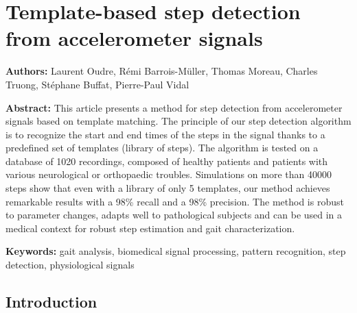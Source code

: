 \documentclass[../thesis.tex]{subfiles}
\begin{document}
\def\crossref{}


\chapter{Template-based step detection from accelerometer signals}
\label{chap:walk:step_detect}



\startcontents[chap7]


\textbf{Authors:}
Laurent Oudre\footnotemark[1]\footnotemark[2], Rémi Barrois-Müller\footnotemark[2], Thomas Moreau\footnotemark[2]\footnotemark[3],
Charles Truong\footnotemark[2]\footnotemark[3], Stéphane Buffat\footnotemark[2], Pierre-Paul Vidal\footnotemark[2]

% 

\textbf{Abstract:}
This article presents a method for step detection from accelerometer signals based on template matching. The principle of our step detection algorithm is to recognize the start and  end times of the steps in the signal thanks to a predefined set of templates (library of steps). The algorithm is tested on a database of 1020 recordings, composed of healthy patients and  patients with various neurological or orthopaedic troubles. Simulations on more than 40000 steps show that even with a library of only 5 templates, our method achieves remarkable results with a 98\% recall and a 98\% precision.  The method  is robust to parameter changes, adapts well to pathological subjects and can be used in a medical context for robust step estimation and gait characterization.


\textbf{Keywords:}
gait analysis, biomedical signal processing, pattern recognition, step detection, physiological signals\\


\section{Introduction}
\end{document}
